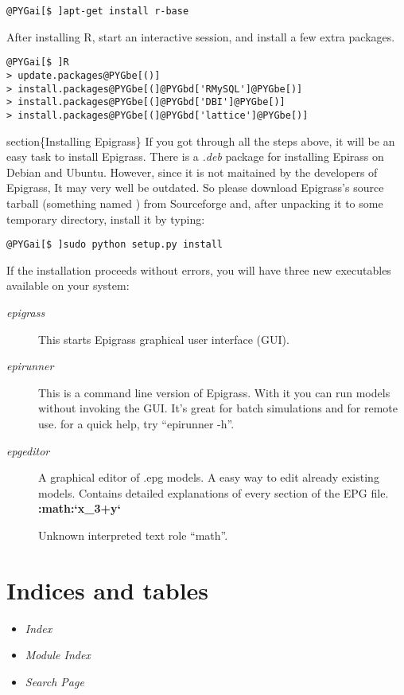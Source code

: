 \documentclass[a4paper,10pt]{manual}
\begin{document}
\begin{Verbatim}[commandchars=@\[\]]
@PYGai[$ ]apt-get install r-base
\end{Verbatim}

After installing R, start an interactive session, and install a few extra packages.

\begin{Verbatim}[commandchars=@\[\]]
@PYGai[$ ]R
> update.packages@PYGbe[()]
> install.packages@PYGbe[(]@PYGbd['RMySQL']@PYGbe[)]
> install.packages@PYGbe[(]@PYGbd['DBI']@PYGbe[)]
> install.packages@PYGbe[(]@PYGbd['lattice']@PYGbe[)]
\end{Verbatim}

section\{Installing Epigrass\}
If you got through all the steps above, it will be an easy task to install Epigrass. There is a \emph{.deb} package for installing Epirass on Debian and Ubuntu. However, since it is not maitained by the developers of Epigrass, It may very well be outdated.  So please download Epigrass's source tarball (something named ) from Sourceforge and, after unpacking it to some temporary directory, install it by typing:

\begin{Verbatim}[commandchars=@\[\]]
@PYGai[$ ]sudo python setup.py install
\end{Verbatim}

If the installation proceeds without errors, you will have three new executables available on your system:
\begin{description}
\item[\emph{epigrass}]
This starts Epigrass graphical user interface (GUI).

\item[\emph{epirunner}]
This is a command line version of Epigrass. With it you can run models without invoking the GUI. It's great for batch simulations and for remote use. for a quick help, try ``epirunner -h''.

\item[\emph{epgeditor}]
A graphical editor of .epg models. A easy way to edit already existing models. Contains detailed explanations of every section of the EPG file. {\color{red}\bfseries{}:math:`x\_3+y`}

Unknown interpreted text role ``math''.


\end{description}

\resetcurrentobjects

\resetcurrentobjects

\resetcurrentobjects

\resetcurrentobjects


\chapter{Indices and tables}
\begin{itemize}
\item {} 
\emph{Index}

\item {} 
\emph{Module Index}

\item {} 
\emph{Search Page}

\end{itemize}
\renewcommand{\indexname}{Module Index}\printmodindex\renewcommand{\indexname}{Index}

\printindex
\end{document}
